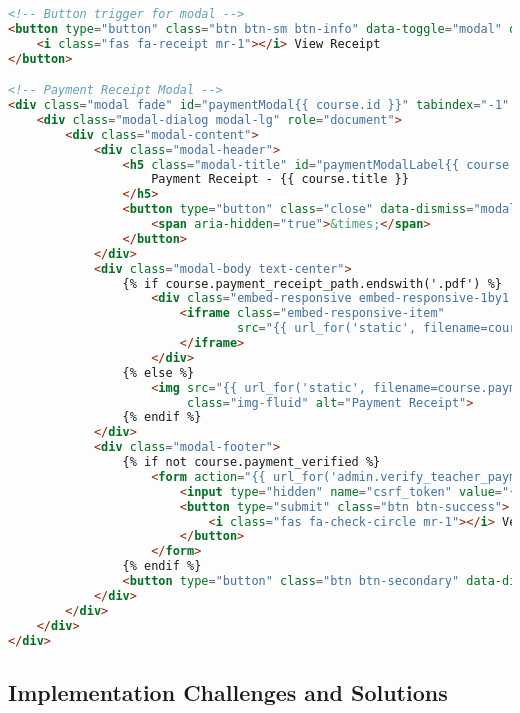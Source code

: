 \begin{lstlisting}[language=HTML, caption=Payment Receipt Modal, label=lst:modal-html]
<!-- Button trigger for modal -->
<button type="button" class="btn btn-sm btn-info" data-toggle="modal" data-target="#paymentModal{{ course.id }}">
    <i class="fas fa-receipt mr-1"></i> View Receipt
</button>

<!-- Payment Receipt Modal -->
<div class="modal fade" id="paymentModal{{ course.id }}" tabindex="-1" role="dialog" aria-labelledby="paymentModalLabel{{ course.id }}" aria-hidden="true">
    <div class="modal-dialog modal-lg" role="document">
        <div class="modal-content">
            <div class="modal-header">
                <h5 class="modal-title" id="paymentModalLabel{{ course.id }}">
                    Payment Receipt - {{ course.title }}
                </h5>
                <button type="button" class="close" data-dismiss="modal" aria-label="Close">
                    <span aria-hidden="true">&times;</span>
                </button>
            </div>
            <div class="modal-body text-center">
                {% if course.payment_receipt_path.endswith('.pdf') %}
                    <div class="embed-responsive embed-responsive-1by1 mb-3">
                        <iframe class="embed-responsive-item" 
                                src="{{ url_for('static', filename=course.payment_receipt_path) }}">
                        </iframe>
                    </div>
                {% else %}
                    <img src="{{ url_for('static', filename=course.payment_receipt_path) }}" 
                         class="img-fluid" alt="Payment Receipt">
                {% endif %}
            </div>
            <div class="modal-footer">
                {% if not course.payment_verified %}
                    <form action="{{ url_for('admin.verify_teacher_payment', course_id=course.id) }}" method="POST">
                        <input type="hidden" name="csrf_token" value="{{ csrf_token() }}">
                        <button type="submit" class="btn btn-success">
                            <i class="fas fa-check-circle mr-1"></i> Verify Payment
                        </button>
                    </form>
                {% endif %}
                <button type="button" class="btn btn-secondary" data-dismiss="modal">Close</button>
            </div>
        </div>
    </div>
</div>
\end{lstlisting}

\subsection{Implementation Challenges and Solutions}

